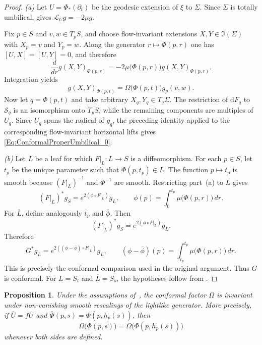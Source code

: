 \documentclass[11pt]{article}
\numberwithin{equation}{section}
\newtheorem{proposition}[theorem]{Proposition}
\begin{document}
	\begin{proof}
		\emph{(a)} Let $U=\Phi_*(\partial_t)$ be the geodesic extension of
		$\xi$ to $\Sigma$. Since $\Sigma$ is totally umbilical,
		 gives $\mathscr L_Ug=-2\mu g$.

		Fix $p\in S$ and $v,w\in T_pS$, and choose flow-invariant
		extensions $X,Y\in\mathfrak I(\Sigma)$ with $X_p=v$ and $Y_p=w$.
		Along the generator $r\mapsto\Phi(p,r)$ one has
		$[U,X]=[U,Y]=0$, and therefore
		\[
			\frac{d}{dr}g(X,Y)_{\Phi(p,r)}
			=-2\mu\bigl(\Phi(p,r)\bigr)
			g(X,Y)_{\Phi(p,r)}.
		\]
		Integration yields
		\[
			g(X,Y)_{\Phi(p,t)}
			=\Omega\bigl(\Phi(p,t)\bigr)g_p(v,w).
		\]
		Now let $q=\Phi(p,t)$ and take arbitrary
		$X_q,Y_q\in T_q\Sigma$. The restriction of $\mathrm dF_q$ to
		$\mathcal S_q$ is an isomorphism onto $T_pS$, while the remaining
		components are multiples of $U_q$. Since $U_q$ spans the radical
		of $g_q$, the preceding identity applied to the corresponding
		flow-invariant horizontal lifts gives
		\eqref{Eq:ConformalProperUmbilical_0}.

		\emph{(b)} Let $L$ be a leaf for which
		$F|_L\colon L\to S$ is a diffeomorphism. For each $p\in S$, let
		$t_p$ be the unique parameter such that $\Phi(p,t_p)\in L$.
		The function $p\mapsto t_p$ is smooth because
		$(F|_L)^{-1}$ and $\Phi^{-1}$ are smooth. Restricting part~(a)
		to $L$ gives
		\[
			(F|_L)^*g_S
			=e^{2(\phi\circ F|_L)}g_L,
			\qquad
			\phi(p)=\int_0^{t_p}\mu\bigl(\Phi(p,r)\bigr)\,dr.
		\]
		For $\overline L$, define analogously $\overline t_p$ and
		$\overline\phi$. Then
		\[
			(F|_{\overline L})^*g_S
			=e^{2(\overline\phi\circ F|_{\overline L})}
			g_{\overline L}.
		\]
		Therefore
		\begin{equation}\label{eq:h_confromal}
			G^*g_{\overline L}
			=e^{2((\phi-\overline\phi)\circ F|_L)}g_L,
			\qquad
			(\phi-\overline\phi)(p)
			=\int_{\overline t_p}^{t_p}
			\mu\bigl(\Phi(p,r)\bigr)\,dr .
		\end{equation}
		This is precisely the conformal comparison used in the original
		argument. Thus $G$ is conformal. For $L=S_t$ and
		$\overline L=S_s$, the hypotheses follow from
		.
	\end{proof}


\begin{proposition}  \label{corollary:invariance_omega_en}
		Under the assumptions of~, the conformal factor $\Omega$ is invariant under non-vanishing smooth rescalings of the lightlike generator. More precisely, if $\overline U=fU$ and $\overline\Phi(p,s)=\Phi(p,h_p(s))$, then
		\[
			\overline\Omega\bigl(\overline\Phi(p,s)\bigr)
			=\Omega\bigl(\Phi(p,h_p(s))\bigr)
		\]
		whenever both sides are defined.
	\end{proposition}
\end{document}
